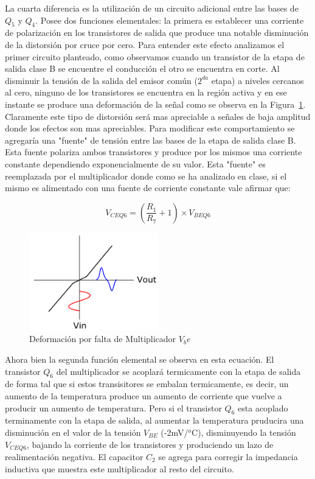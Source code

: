 La cuarta diferencia es la utilización de un circuito adicional entre las bases de $Q_5$ y $Q_4$. Posee dos funciones elementales: la primera es establecer una corriente de polarización en los transistores de salida que produce una notable disminución de la distorsión por cruce por cero. Para entender este efecto analizamos el primer circuito planteado, como observamos cuando un transistor de la etapa de salida clase B se encuentre el conducción el otro se encuentra en corte. Al disminuir la tensión de la salida del emisor común ($2^{da}$ etapa) a niveles cercanos al cero, ninguno de los transistores se encuentra en la región activa y en ese instante se produce una deformación de la señal como se observa en la Figura~\ref{falta_Vbe}. Claramente este tipo de distorsión será mas apreciable a señales de baja amplitud donde los efectos son mas apreciables. Para modificar este comportamiento se agregaría una "fuente" de tensión entre las bases de la etapa de salida clase B. Esta fuente polariza ambos transistores y produce por los mismos una corriente constante dependiendo exponencialmente de su valor. Esta "fuente" es reemplazada por el multiplicador donde como se ha analizado en clase, si el mismo es alimentado con una fuente de corriente constante vale afirmar que:

$$
V_{CE Q6} = (\frac{R_1}{R_7} + 1 ) \times V_{BE Q6}
$$

\begin{figure}[H]
\centering
\includegraphics[width=0.5\textwidth]{img/falta_Vbe.png}
\caption{Deformación por falta de Multiplicador $V_be$}
\label{falta_Vbe}
\end{figure}

Ahora bien la segunda función elemental se observa en esta ecuación. El transistor $Q_6$ del multiplicador se acoplará termicamente con la etapa de salida de forma tal que si estos transisitores se embalan termicamente, es decir, un aumento de la temperatura produce un aumento de corriente que vuelve a producir un aumento de temperatura. Pero si el transistor $Q_6$ esta acoplado terminamente con la etapa de salida, al aumentar la temperatura pruducira una disminución en el valor de la tensión $V_{BE}$ (-2mV/$^o$C), disminuyendo la tensión $V_{CE Q6}$, bajando la corriente de los transistores y produciendo un lazo de realimentación negativa. El capacitor $C_2$ se agrega para corregir la impedancia inductiva que muestra este multiplicador al resto del circuito.

